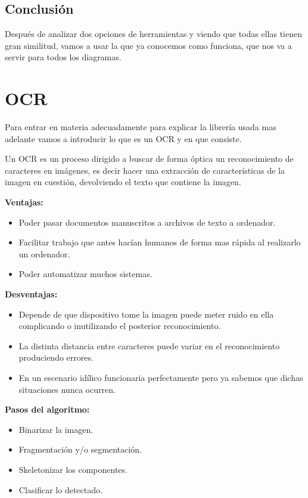 \subsection{Conclusión}
Después de analizar dos opciones de herramientas y viendo que todas ellas tienen gran similitud, vamos a usar la que ya conocemos como funciona, que nos va a servir para todos los diagramas.

\section{OCR}
Para entrar en materia adecuadamente para explicar la librería usada mas adelante vamos a introducir lo que es un OCR  \cite{OCR} y en que consiste.

Un OCR es un proceso dirigido a buscar de forma óptica un reconocimiento de caracteres en imágenes, es decir hacer una extracción de características de la imagen en cuestión, devolviendo el texto que contiene la imagen.

\textbf{Ventajas:}
\begin{itemize}
\item Poder pasar documentos manuscritos a archivos de texto a ordenador.
\item Facilitar trabajo que antes hacían humanos de forma mas rápida al realizarlo un ordenador.
\item Poder automatizar muchos sistemas.
\end{itemize}

\textbf{Desventajas:}
\begin{itemize}
\item Depende de que dispositivo tome la imagen puede meter ruido en ella complicando o inutilizando el posterior reconocimiento.
\item La distinta distancia entre caracteres puede variar en el reconocimiento produciendo errores.
\item En un escenario idílico funcionaria perfectamente pero ya sabemos que dichas situaciones nunca ocurren.
\end{itemize}

\textbf{Pasos del algoritmo:}
\begin{itemize}
\item Binarizar la imagen.
\item Fragmentación y/o segmentación.
\item Skeletonizar los componentes.
\item Clasificar lo detectado.
\end{itemize}

